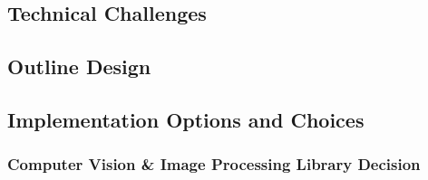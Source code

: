 \documentclass[11pt,fleqn,twoside]{article}
\begin{document}
\subsection{Technical Challenges}


\subsection{Outline Design}

\subsection{Implementation Options and Choices}

\subsubsection{Computer Vision \& Image Processing Library Decision}
\end{document}
